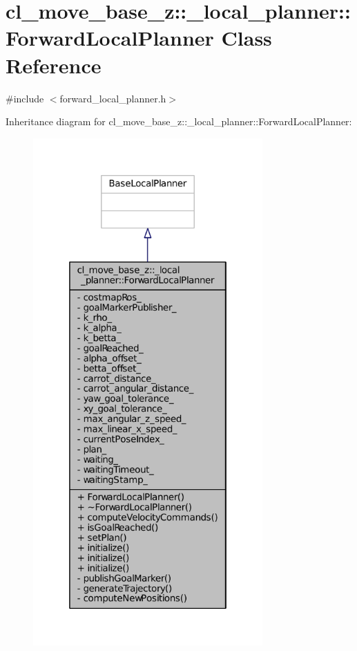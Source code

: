 \hypertarget{classcl__move__base__z_1_1__local__planner_1_1ForwardLocalPlanner}{}\section{cl\+\_\+move\+\_\+base\+\_\+z\+:\+:\+\_\+local\+\_\+planner\+:\+:Forward\+Local\+Planner Class Reference}
\label{classcl__move__base__z_1_1__local__planner_1_1ForwardLocalPlanner}


{\ttfamily \#include $<$forward\+\_\+local\+\_\+planner.\+h$>$}



Inheritance diagram for cl\+\_\+move\+\_\+base\+\_\+z\+:\+:\+\_\+local\+\_\+planner\+:\+:Forward\+Local\+Planner\+:
\nopagebreak
\begin{figure}[H]
\begin{center}
\leavevmode
\includegraphics[height=550pt]{classcl__move__base__z_1_1__local__planner_1_1ForwardLocalPlanner__inherit__graph}
\end{center}
\end{figure}


